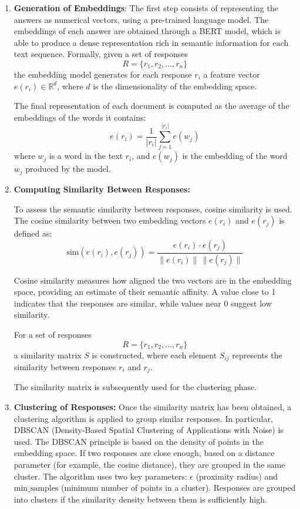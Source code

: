 \begin{enumerate}
    \item \textbf{Generation of Embeddings}: The first step consists of representing the answers as numerical vectors, using a pre-trained language model. The embeddings of each answer are obtained through a BERT \cite{Bert} model, which is able to produce a dense representation rich in semantic information for each text sequence.
    Formally, given a set of responses 
\[
R = \{ r_1, r_2, \dots, r_n \}
\]
the embedding model generates for each response \( r_i \) a feature vector \( e(r_i) \in \mathbb{R}^d \), where \( d \) is the dimensionality of the embedding space.

The final representation of each document is computed as the average of the embeddings of the words it contains:
\[
e(r_i) = \frac{1}{|r_i|} \sum_{j=1}^{|r_i|} e(w_j)
\]
where \( w_j \) is a word in the text \( r_i \), and \( e(w_j) \) is the embedding of the word \( w_j \) produced by the model.

    \item\textbf{Computing Similarity Between Responses:}

To assess the semantic similarity between responses, cosine similarity is used. The cosine similarity between two embedding vectors \( e(r_i) \) and \( e(r_j) \) is defined as:
\[
\text{sim}(e(r_i), e(r_j)) = \frac{e(r_i) \cdot e(r_j)}{\|e(r_i)\| \, \|e(r_j)\|}
\]

Cosine similarity measures how aligned the two vectors are in the embedding space, providing an estimate of their semantic affinity. A value close to 1 indicates that the responses are similar, while values near 0 suggest low similarity.

For a set of responses 
\[
R = \{ r_1, r_2, \dots, r_n \}
\]
a similarity matrix \( S \) is constructed, where each element \( S_{ij} \) represents the similarity between responses \( r_i \) and \( r_j \).

The similarity matrix is subsequently used for the clustering phase.
    \item \textbf{Clustering of Responses:} Once the similarity matrix has been obtained, a clustering algorithm is applied to group similar responses. In particular, DBSCAN (Density-Based Spatial Clustering of Applications with Noise)\cite{DBSCAN} is used.
    The DBSCAN principle is based on the density of points in the embedding space. If two responses are close enough, based on a distance parameter (for example, the cosine distance), they are grouped in the same cluster.
    The algorithm uses two key parameters: 
\( \epsilon \) (proximity radius) and \( \text{min\_samples} \) (minimum number of points in a cluster). Responses are grouped into clusters if the similarity density between them is sufficiently high.


\end{enumerate}
